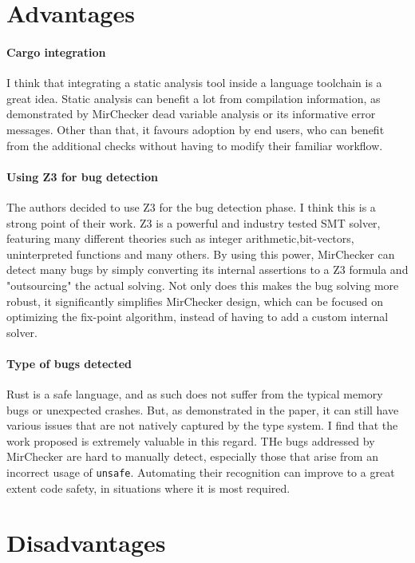 \documentclass{article}
\begin{document}
 \section*{Advantages}

 \paragraph*{Cargo integration} I think that integrating a static analysis tool inside a language toolchain is a great idea. 
 Static analysis can benefit a lot from compilation information, as demonstrated by MirChecker dead variable analysis or its 
 informative error messages. Other than that, it favours adoption by end users, who can benefit from the additional checks without 
 having to modify their familiar workflow.


 \paragraph*{Using Z3 for bug detection} The authors decided to use Z3 for the bug detection phase. I think this is a 
 strong point of their work. Z3 is a powerful and industry tested SMT solver, featuring many different theories such as integer 
 arithmetic,bit-vectors, uninterpreted functions and many others. By using this power, MirChecker can detect many bugs by simply 
 converting its internal assertions to a Z3 formula and "outsourcing" the actual solving. Not only does this makes the bug solving more robust, 
 it significantly simplifies MirChecker design, which can be focused on optimizing the fix-point algorithm, instead of having to add a custom internal solver.

 \paragraph*{Type of bugs detected} Rust is a safe language, and as such does not suffer from the typical memory bugs or unexpected crashes. But, as demonstrated in the paper, 
 it can still have various issues that are not natively captured by the type system. I find that the work proposed is extremely valuable in this regard. THe bugs addressed by MirChecker
 are hard to manually detect, especially those that arise from an incorrect usage of \texttt{unsafe}. Automating their recognition can improve to a great extent code safety, in situations 
 where it is most required.
\section*{Disadvantages}
\end{document}
